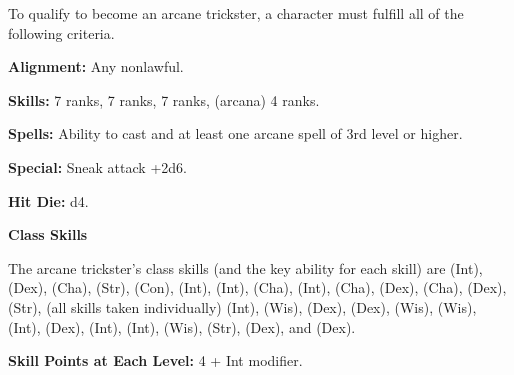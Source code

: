 
\Requirements

To qualify to become an arcane trickster, a character must fulfill all of the following 
criteria.

\textbf{Alignment:} Any nonlawful.

\textbf{Skills:}  7 ranks,  7 ranks,  
7 ranks,  (arcana) 4 ranks.

\textbf{Spells:} Ability to cast  and at least one arcane spell 
of 3rd level or higher.

\textbf{Special:} Sneak attack +2d6.

\Basics

\textbf{Hit Die:} d4.

\textbf{Class Skills}

The arcane trickster's class skills (and the key ability for each skill) are  
(Int),  (Dex),  (Cha),  (Str),  (Con),  (Int), 
 (Int),  (Cha),  (Int),  (Cha), 
(Dex),  (Cha),  (Dex),  (Str),  (all 
skills taken individually) (Int),  (Wis),  (Dex),  
(Dex),  (Wis),  (Wis),  (Int),  (Dex), 
 (Int),  (Int),  (Wis),  (Str),  (Dex), and 
 (Dex).

\textbf{Skill Points at Each Level:} 4 + Int modifier.


